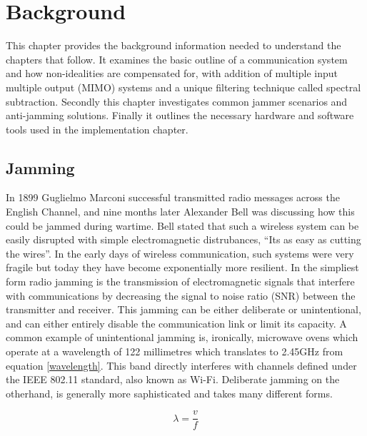 \chapter{Background}
\label{ch:background}

This chapter provides the background information needed to understand the chapters that follow.  It examines the basic outline of a communication system and how non-idealities are compensated for, with addition of multiple input multiple output (MIMO) systems and a unique filtering technique called spectral subtraction.   Secondly this chapter investigates common jammer scenarios and anti-jamming solutions.  Finally it outlines the necessary hardware and software tools used in the implementation chapter.

\section{Jamming}

In 1899 Guglielmo Marconi successful transmitted radio messages across the English Channel, and nine months later Alexander Bell was discussing how this could be jammed during wartime\cite{10}. Bell stated that such a wireless system can be easily disrupted with simple electromagnetic distrubances,  ``Its as easy as cutting the wires''.\cite{10}  In the early days of wireless communication, such systems were very fragile but today they have become exponentially more resilient. In the simpliest form radio jamming is the transmission of electromagnetic signals that interfere with communications by decreasing the signal to noise ratio (SNR) between the transmitter and receiver.  This jamming can be either deliberate or unintentional, and can either entirely disable the communication link or limit its capacity.  A common example of unintentional jamming is, ironically, microwave ovens which operate at a  wavelength of 122 millimetres which translates to 2.45GHz from equation \eqref{wavelength}.  This band directly interferes with channels defined under the IEEE 802.11 standard, also known as Wi-Fi\cite{ieee80211}.  Deliberate jamming on the otherhand, is generally more saphisticated and takes many different forms.

\begin{equation}\label{wavelength}
\lambda=\frac{v}{f}
\end{equation}

